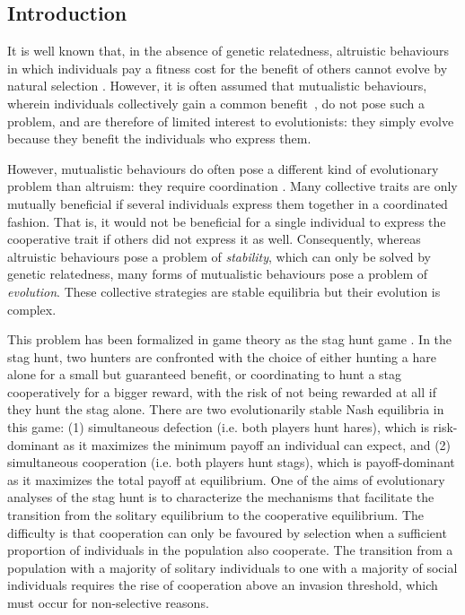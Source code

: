   \subsection{Introduction}
    It is well known that, in the absence of genetic relatedness, altruistic behaviours in which individuals pay a fitness cost for the benefit of others cannot evolve by natural selection \cite{Hamilton1964,West2007a}. However, it is often assumed that mutualistic behaviours, wherein individuals collectively gain a common benefit~\cite{Leimar2003, Leimar2010}, do not pose such a problem, and are therefore of limited interest to evolutionists: they simply evolve because they benefit the individuals who express them.

    However, mutualistic behaviours do often pose a different kind of evolutionary problem than altruism: they require coordination \cite{Alvard2001, Alvard2003, Drea2009, Leimar2003}. Many collective traits are only mutually beneficial if several individuals express them together in a coordinated fashion. That is, it would not be beneficial for a single individual to express the cooperative trait if others did not express it as well. Consequently, whereas altruistic behaviours pose a problem of \textit{stability}, which can only be solved by genetic relatedness, many forms of mutualistic behaviours pose a problem of \textit{evolution}. These collective strategies are stable equilibria but their evolution is complex. 

    This problem has been formalized in game theory as the stag hunt game \cite{Skyrms2004}. In the stag hunt, two hunters are confronted with the choice of either hunting a hare alone for a small but guaranteed benefit, or coordinating to hunt a stag cooperatively for a bigger reward, with the risk of not being rewarded at all if they hunt the stag alone. There are two evolutionarily stable Nash equilibria in this game: (1) simultaneous defection (i.e. both players hunt hares), which is risk-dominant as it maximizes the minimum payoff an individual can expect, and (2) simultaneous cooperation (i.e. both players hunt stags), which is payoff-dominant as it maximizes the total payoff at equilibrium. One of the aims of evolutionary analyses of the stag hunt is to characterize the mechanisms that facilitate the transition from the solitary equilibrium to the cooperative equilibrium. The difficulty is that cooperation can only be favoured by selection when a sufficient proportion of individuals in the population also cooperate. The transition from a population with a majority of solitary individuals to one with a majority of social individuals requires the rise of cooperation above an invasion threshold, which must occur for non-selective reasons.


